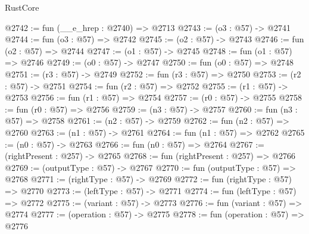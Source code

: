 \begin{lexlean}{RustCore}
\begin{coremodule}
@2742 := fun (__e_hrep : @2740) => @2713
@2743 := (o3 : @57) -> @2741
@2744 := fun (o3 : @57) => @2742
@2745 := (o2 : @57) -> @2743
@2746 := fun (o2 : @57) => @2744
@2747 := (o1 : @57) -> @2745
@2748 := fun (o1 : @57) => @2746
@2749 := (o0 : @57) -> @2747
@2750 := fun (o0 : @57) => @2748
@2751 := (r3 : @57) -> @2749
@2752 := fun (r3 : @57) => @2750
@2753 := (r2 : @57) -> @2751
@2754 := fun (r2 : @57) => @2752
@2755 := (r1 : @57) -> @2753
@2756 := fun (r1 : @57) => @2754
@2757 := (r0 : @57) -> @2755
@2758 := fun (r0 : @57) => @2756
@2759 := (n3 : @57) -> @2757
@2760 := fun (n3 : @57) => @2758
@2761 := (n2 : @57) -> @2759
@2762 := fun (n2 : @57) => @2760
@2763 := (n1 : @57) -> @2761
@2764 := fun (n1 : @57) => @2762
@2765 := (n0 : @57) -> @2763
@2766 := fun (n0 : @57) => @2764
@2767 := (rightPresent : @257) -> @2765
@2768 := fun (rightPresent : @257) => @2766
@2769 := (outputType : @57) -> @2767
@2770 := fun (outputType : @57) => @2768
@2771 := (rightType : @57) -> @2769
@2772 := fun (rightType : @57) => @2770
@2773 := (leftType : @57) -> @2771
@2774 := fun (leftType : @57) => @2772
@2775 := (variant : @57) -> @2773
@2776 := fun (variant : @57) => @2774
@2777 := (operation : @57) -> @2775
@2778 := fun (operation : @57) => @2776
\end{coremodule}
\end{lexlean}
